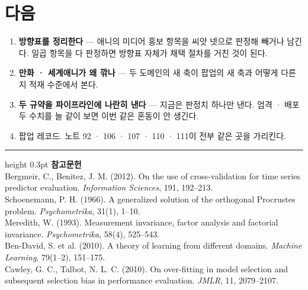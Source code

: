 \documentclass[10pt]{article}
\begin{document}
\section{다음}

\begin{enumerate}[leftmargin=1.3em,itemsep=0.15em]
\item \textbf{방향표를 정리한다} --- 애니의 미디어 홍보 항목을 씨앗 넷으로
      판정해 빼거나 남긴다. 일곱 항목을 다 판정하면 방향표 자체가 채택
      절차를 거친 것이 된다.
\item \textbf{만화 · 세계애니가 왜 깎나} --- 두 도메인의 새 축이 팝업의
      새 축과 어떻게 다른지 적재 수준에서 본다.
\item \textbf{두 규약을 파이프라인에 나란히 낸다} --- 지금은 판정치 하나만
      낸다. 엄격 · 배포 두 수치를 늘 같이 보면 이번 같은 혼동이 안 생긴다.
\item 팝업 레코드. 노트 92 · 106 · 107 · 110 · 111이 전부 같은 곳을 가리킨다.
\end{enumerate}

\vspace{0.6em}
\hrule height 0.3pt
\vspace{0.5em}
{\footnotesize
\textbf{참고문헌}\\[0.3em]
Bergmeir, C., Benitez, J. M. (2012). On the use of cross-validation for time
series predictor evaluation. \emph{Information Sciences}, 191, 192--213.\\[0.15em]
Schoenemann, P. H. (1966). A generalized solution of the orthogonal Procrustes
problem. \emph{Psychometrika}, 31(1), 1--10.\\[0.15em]
Meredith, W. (1993). Measurement invariance, factor analysis and factorial
invariance. \emph{Psychometrika}, 58(4), 525--543.\\[0.15em]
Ben-David, S. et al. (2010). A theory of learning from different domains.
\emph{Machine Learning}, 79(1--2), 151--175.\\[0.15em]
Cawley, G. C., Talbot, N. L. C. (2010). On over-fitting in model selection and
subsequent selection bias in performance evaluation. \emph{JMLR}, 11, 2079--2107.
}
\end{document}
